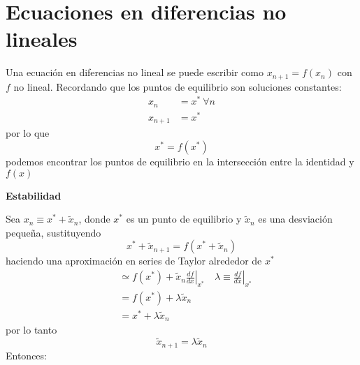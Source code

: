 \section{Ecuaciones en diferencias no lineales}

\begin{comment}
	\begin{table}[H]
		\centering
		\caption{caption}
		\label{tab:label}
	
		\begin{tabular}{c}
			Ecuaciones en diferenciales
			\begin{itemize}
				\item Puntos de equilibrio
							\begin{equation*}
							  \dot{x}=0 
							\end{equation*}
				\item No tenemos oscilaciones en 1D
				\item $x^*$ es estable si $r<0$
				 \item $x^*$ es inestable si $r>0$
	
			\end{itemize}
		\end{tabular}
	\end{table}
\end{comment}

Una ecuación en diferencias no lineal se puede escribir como $x_{n+1}=f(x_n)$ con $f$ no lineal. Recordando que los puntos de equilibrio son soluciones constantes:
 \begin{align*}
  x_n &= x^* \ \forall n \\
	x_{n+1}&=x^*
\end{align*}
por lo que
\begin{equation*}
  x^*=f(x^*) 
\end{equation*}
podemos encontrar los puntos de equilibrio en la intersección entre la identidad y $f(x)$

\textbf{Estabilidad}

Sea $x_{n} \equiv x^* + \tilde{x}_n$, donde $x^*$ es un punto de equilibrio y $\tilde{x}_n$ es una desviación pequeña, sustituyendo
\begin{equation*}
  x^* + \tilde{x}_{n+1} = f(x^*+\tilde{x}_n) 
\end{equation*}
	haciendo una aproximación en series de Taylor alrededor de $x^*$
\begin{align*}
												& \simeq f(x^*) + \tilde{x}_n \left. \frac{df}{dx} \right|_{x^*} \quad \lambda \equiv \left. \frac{df}{dx} \right|_{x^*} \\
												&= f(x^*) + \lambda \tilde{x}_n \\
												&= x^* + \lambda \tilde{x}_n
\end{align*}
por lo tanto
\begin{equation*}
  \tilde{x}_{n+1} = \lambda \tilde{x}_n 
\end{equation*}
Entonces:

